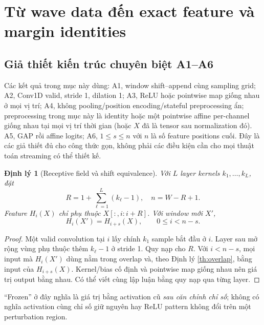 \documentclass[11pt,a4paper]{article}
\newtheorem{theorem}[definition]{Định lý}
\theoremstyle{remark}
\begin{document}
\section{Từ wave data đến exact feature và margin identities}
\subsection{Giả thiết kiến trúc chuyên biệt A1--A6}
Các kết quả trong mục này dùng: A1, window shift--append cùng sampling grid;
A2, Conv1D valid, stride 1, dilation 1; A3, ReLU hoặc pointwise map giống
nhau ở mọi vị trí; A4, không pooling/position encoding/stateful preprocessing
ẩn; preprocessing trong mục này là identity hoặc một pointwise affine
per-channel giống nhau tại mọi vị trí thời gian (hoặc $X$ đã là tensor sau
normalization đó). A5, GAP rồi affine logits; A6, $1\le s\le n$ với $n$ là số feature
positions cuối. Đây là các giả thiết đủ cho công thức gọn, không phải các
điều kiện cần cho mọi thuật toán streaming có thể thiết kế.

\begin{theorem}[Receptive field và shift equivalence]\label{th:feature}
Với $L$ layer kernels $k_1,\ldots,k_L$, đặt
\begin{equation}
 R=1+\sum_{\ell=1}^L(k_\ell-1),\quad n=W-R+1.
\end{equation}
Feature $H_i(X)$ chỉ phụ thuộc $X[:,i:i+R]$. Với window mới $X'$,
\begin{equation}
 H_i(X')=H_{i+s}(X),\qquad 0\le i<n-s.
 \label{eq:frozen}
\end{equation}
\end{theorem}
\begin{proof}
Một valid convolution tại $i$ lấy chính $k_1$ sample bắt đầu ở $i$.
Layer sau mở rộng vùng phụ thuộc thêm $k_\ell-1$ ở stride 1. Quy nạp cho
$R$. Với $i<n-s$, mọi input mà $H_i(X')$ dùng nằm trong overlap và, theo
Định lý \ref{th:overlap}, bằng input của $H_{i+s}(X)$. Kernel/bias cố định
và pointwise map giống nhau nên giá trị output bằng nhau. Có thể viết cùng
lập luận bằng quy nạp qua từng layer.
\end{proof}
``Frozen'' ở đây nghĩa là giá trị bằng activation cũ \emph{sau căn chỉnh
chỉ số}; không có nghĩa activation cùng chỉ số giữ nguyên hay ReLU pattern
không đổi trên một perturbation region.
\end{document}
